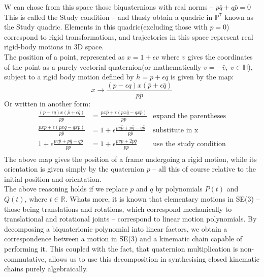 W can chose from this space those biquaternions with real norms -- $p\bar{q} + q\bar{p} = 0$ This is called the Study condition -- 
and thusly obtain a quadric in $\mathbb{P}^{7}$ known as the Study quadric. 
Elements in this quadric(excluding those with $p = 0$) correspond to rigid transformations, and trajectories in this space represent real rigid-body motions in 3D space. \\
The position of a point, represented as $x = 1 +\epsilon v$ where  $v$ gives the coordinates of the point as a purely vectorial quaternion(or mathematically $v = -\bar{v},\; v\in \mathbb{H}$), subject to a rigid body motion defined by $h = p + \epsilon q$ is given by the map\cite{Siegele_2021}:
 \begin{equation}
     x \rightarrow \frac{(p - \epsilon q)x(\bar{p}+\epsilon \bar{q})}{p\bar{p}}
\end{equation}
Or written in another form:
\begin{equation}
    \label{act}
    \begin{aligned}
        \frac{(p - \epsilon q)x(\bar{p}+\epsilon \bar{q})}{p\bar{p}}&=\frac{px\bar{p} + \epsilon(px\bar{q} - qx\bar{p})}{p\bar{p}}&\mbox{expand the parentheses}\\[1.25ex]
        \frac{px\bar{p} + \epsilon(px\bar{q} - qx\bar{p})}{p\bar{p}}&= 1+\epsilon\frac{pv\bar{p} + p\bar{q} - q\bar{p}}{p\bar{p}}&\mbox{substitute in x}\\[1.25ex]
        1+\epsilon\frac{pv\bar{p} + p\bar{q} - q\bar{p}}{p\bar{p}}&= 1 + \epsilon \frac{pvp + 2p\bar{q}}{p\bar{p}}&\mbox{use the study condition}\\[1.25ex]
    \end{aligned}
\end{equation}
The above map gives the position of a frame undergoing a rigid motion, while its orientation is given simply by the quaternion $p$ -- all this of course relative to the initial position and orientation.\\
The above reasoning holds if we replace $p$ and $q$ by polynomials $P(t)$ and $Q(t)$, where $t \in \mathbb{R}$.
Whats more, it is known that elementary motions in SE(3) -- those being translations and rotations, which correspond mechanically to translational and rotational joints -- correspond to linear motion polynomials. 
By decomposing a biquaterionic polynomial into linear factors, we obtain a correspondence between a motion in SE(3) and a kinematic chain capable of performing it. This coupled with the fact, that quaternion multiplication is non-commutative, allows us to use this decomposition in synthesising closed kinematic chains purely algebraically.
\clearpage
